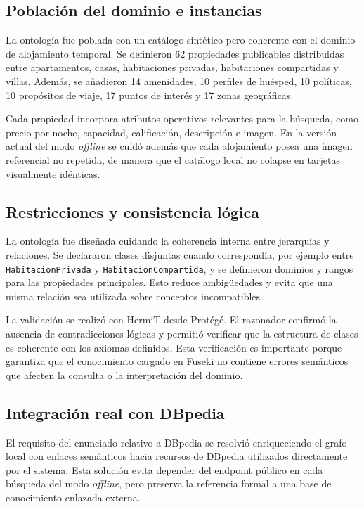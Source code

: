 \subsection{Población del dominio e instancias}

La ontología fue poblada con un catálogo sintético pero coherente con el dominio de
alojamiento temporal. Se definieron 62 propiedades publicables distribuidas entre
apartamentos, casas, habitaciones privadas, habitaciones compartidas y villas. Además,
se añadieron 14 amenidades, 10 perfiles de huésped, 10 políticas, 10 propósitos de
viaje, 17 puntos de interés y 17 zonas geográficas.

Cada propiedad incorpora atributos operativos relevantes para la búsqueda, como precio
por noche, capacidad, calificación, descripción e imagen. En la versión actual del modo
\textit{offline} se cuidó además que cada alojamiento posea una imagen referencial no
repetida, de manera que el catálogo local no colapse en tarjetas visualmente idénticas.

\subsection{Restricciones y consistencia lógica}

La ontología fue diseñada cuidando la coherencia interna entre jerarquías y relaciones.
Se declararon clases disjuntas cuando correspondía, por ejemplo entre
\texttt{HabitacionPrivada} y \texttt{HabitacionCompartida}, y se definieron dominios y
rangos para las propiedades principales. Esto reduce ambigüedades y evita que una misma
relación sea utilizada sobre conceptos incompatibles.

La validación se realizó con HermiT desde Protégé. El razonador confirmó la ausencia de
contradicciones lógicas y permitió verificar que la estructura de clases es coherente
con los axiomas definidos. Esta verificación es importante porque garantiza que el
conocimiento cargado en Fuseki no contiene errores semánticos que afecten la consulta o
la interpretación del dominio.

\subsection{Integración real con DBpedia}

El requisito del enunciado relativo a DBpedia se resolvió enriqueciendo el grafo local
con enlaces semánticos hacia recursos de DBpedia utilizados directamente por el sistema.
Esta solución evita depender del endpoint público en cada búsqueda del modo
\textit{offline}, pero preserva la referencia formal a una base de conocimiento enlazada
externa.

